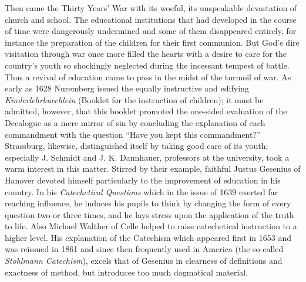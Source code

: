 Then came the Thirty Years’ War with its woeful, its unspeakable devastation of church and school. The educational institutions that had developed in the course of time were dangerously undermined and some of them disappeared entirely, for instance the preparation of the children for their first communion. But God’s dire visitation through war once more filled the hearts with a desire to care for the country’s youth so shockingly neglected during the incessant tempest of battle. Thus a revival of education came to pass in the midst of the turmoil of war. As early as 1628 Nuremberg issued the equally instructive and edifying \emph{Kinderlehrbuechlein} (Booklet for the instruction of children); it must be admitted, however, that this booklet promoted the one-sided evaluation of the Decalogue as a mere mirror of sin by concluding the explanation of each commandment with the question “Have you kept this commandment?” Strassburg, likewise, distinguished itself by taking good care of its youth; especially J. Schmidt and J. K. Dannhauer, professors at the university, took a warm interest in this matter. Stirred by their example, faithful Justus Gesenius of Hanover devoted himself particularly to the improvement of education in his country. In his \emph{Catechetical Questions} which in the issue of 1639 exerted far reaching influence, he induces his pupils to think by changing the form of every question two or three times, and he lays stress upon the application of the truth to life. Also Michael Walther of Celle helped to raise catechetical instruction to a higher level. His explanation of the Catechism which appeared first in 1653 and was reissued in 1861 and since then frequently used in America (the so-called \emph{Stohlmann Catechism}), excels that of Gesenius in clearness
 of definitions and exactness of method, but introduces too much dogmatical material.

